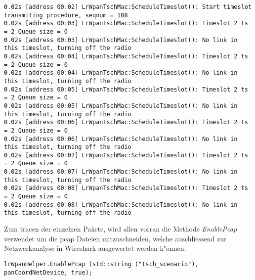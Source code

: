 \begin{lstlisting}[frame=single]
0.02s [address 00:02] LrWpanTschMac:ScheduleTimeslot(): Start timeslot transmiting procedure, seqnum = 108
0.02s [address 00:03] LrWpanTschMac:ScheduleTimeslot(): Timeslot 2 ts = 2 Queue size = 0
0.02s [address 00:03] LrWpanTschMac:ScheduleTimeslot(): No link in this timeslot, turning off the radio
0.02s [address 00:04] LrWpanTschMac:ScheduleTimeslot(): Timeslot 2 ts = 2 Queue size = 0
0.02s [address 00:04] LrWpanTschMac:ScheduleTimeslot(): No link in this timeslot, turning off the radio
0.02s [address 00:05] LrWpanTschMac:ScheduleTimeslot(): Timeslot 2 ts = 2 Queue size = 0
0.02s [address 00:05] LrWpanTschMac:ScheduleTimeslot(): No link in this timeslot, turning off the radio
0.02s [address 00:06] LrWpanTschMac:ScheduleTimeslot(): Timeslot 2 ts = 2 Queue size = 0
0.02s [address 00:06] LrWpanTschMac:ScheduleTimeslot(): No link in this timeslot, turning off the radio
0.02s [address 00:07] LrWpanTschMac:ScheduleTimeslot(): Timeslot 2 ts = 2 Queue size = 0
0.02s [address 00:07] LrWpanTschMac:ScheduleTimeslot(): No link in this timeslot, turning off the radio
0.02s [address 00:08] LrWpanTschMac:ScheduleTimeslot(): Timeslot 2 ts = 2 Queue size = 0
0.02s [address 00:08] LrWpanTschMac:ScheduleTimeslot(): No link in this timeslot, turning off the radio
\end{lstlisting}


Zum tracen der einzelnen Pakete, wird allen vorran die Methode \textit{EnablePcap}
verwendet um die pcap Dateien mitzuschneiden, welche anschliessend zur Netzwerkanalyse
in Wireshark ausgewertet werden k"onnen.
\begin{lstlisting}[frame=single]
lrWpanHelper.EnablePcap (std::string ("tsch_scenario"), panCoordNetDevice, true);
\end{lstlisting}
